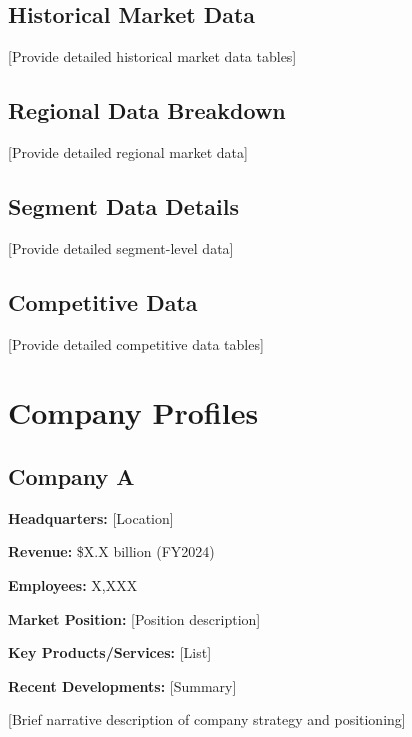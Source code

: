 \documentclass[11pt,letterpaper]{report}
\begin{document}
\section{Historical Market Data}

[Provide detailed historical market data tables]

\section{Regional Data Breakdown}

[Provide detailed regional market data]

\section{Segment Data Details}

[Provide detailed segment-level data]

\section{Competitive Data}

[Provide detailed competitive data tables]

\chapter{Company Profiles}

\section{Company A}

\begin{calloutbox}
\textbf{Headquarters:} [Location]

\textbf{Revenue:} \$X.X billion (FY2024)

\textbf{Employees:} X,XXX

\textbf{Market Position:} [Position description]

\textbf{Key Products/Services:} [List]

\textbf{Recent Developments:} [Summary]
\end{calloutbox}

[Brief narrative description of company strategy and positioning]
\end{document}
